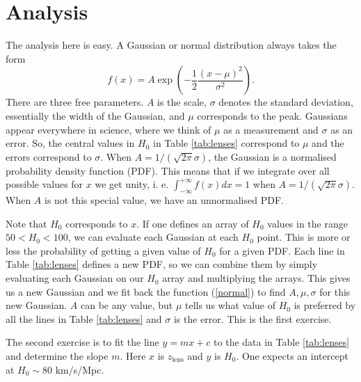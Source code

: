 \documentclass[aps,prl,10pt,twocolumn,superscriptaddress]{revtex4}
\def\be{\begin{equation}}
\def\ee{\end{equation}}
\begin{document}
\section{Analysis} 
The analysis here is easy. A Gaussian or normal distribution always takes the form
\be
\label{normal}
f(x) = A \exp \left( -\frac{1}{2} \frac{(x - \mu)^2}{\sigma^2} \right). 
\ee
There are three free parameters. $A$ is the scale, $\sigma$ denotes the standard deviation, essentially the width of the Gaussian, and $\mu$ corresponds to the peak. Gaussians appear everywhere in science, where we think of $\mu$ as a measurement and $\sigma$ as an error. So, the central values in $H_0$ in Table \ref{tab:lenses} correspond to $\mu$ and the errors correspond to $\sigma$. When $A = 1/(\sqrt{2 \pi}\sigma)$, the Gaussian is a normalised probability density function (PDF). This means that if we integrate over all possible values for $x$ we get unity, i. e. $\int_{-\infty}^{+\infty} f(x) d x= 1$ when $A = 1/(\sqrt{2 \pi} \sigma)$. When $A$ is not this special value, we have an unnormalised PDF. 

Note that $H_0$ corresponds to $x$. If one defines an array of $H_0$ values in the range $50 < H_0 < 100$, we can evaluate each Gaussian at each $H_0$ point. This is more or less the probability of getting a given value of $H_0$ for a given PDF. Each line in Table \ref{tab:lenses} defines a new PDF, so we can combine them by simply evaluating each Gaussian on our $H_0$ array and multiplying the arrays. This gives us a new Gaussian and we fit back the function (\ref{normal}) to find $A, \mu, \sigma$ for this new Gaussian. $A$ can be any value, but $\mu$ tells us what value of $H_0$ is preferred by all the lines in Table \ref{tab:lenses} and $\sigma$ is the error. This is the first exercise. 

The second exercise is to fit the line $y = m x + c$ to the data in Table \ref{tab:lenses} and determine the slope $m$. Here $x$ is $z_{\textrm{lens}}$ and $y$ is $H_0$. One expects an intercept at $H_0 \sim 80$ km/s/Mpc. 
\end{document}
